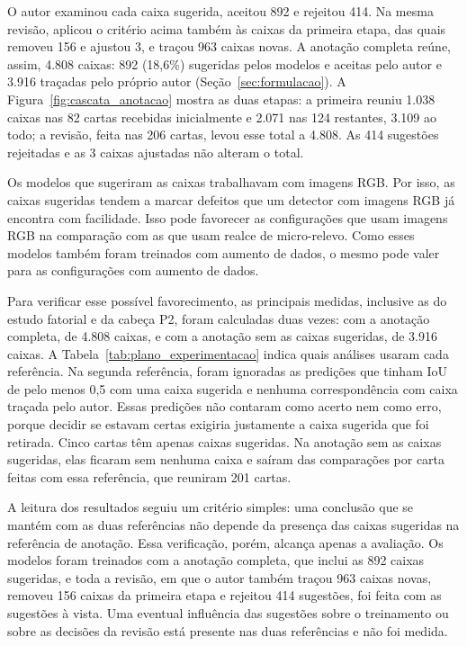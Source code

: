 \documentclass[
    12pt,                %
    openright,           %
    oneside,             %
    a4paper,             %
    english,             %
    brazil               %
]{abntex2}
\begin{document}
O autor examinou cada
caixa sugerida, aceitou 892 e rejeitou 414. Na mesma revisão, aplicou o
critério acima também às caixas da primeira etapa, das quais removeu
156 e ajustou 3, e traçou 963 caixas novas. A anotação completa reúne,
assim, 4.808 caixas: 892 (18,6\%) sugeridas pelos modelos e aceitas
pelo autor e 3.916 traçadas pelo próprio autor
(Seção~\ref{sec:formulacao}).
A Figura~\ref{fig:cascata_anotacao} mostra as duas etapas: a primeira
reuniu 1.038 caixas nas 82 cartas recebidas inicialmente e 2.071 nas
124 restantes, 3.109 ao todo; a revisão, feita nas 206 cartas, levou
esse total a 4.808. As 414 sugestões rejeitadas e as 3 caixas ajustadas
não alteram o total.

Os modelos que sugeriram as caixas trabalhavam com imagens RGB. Por
isso, as caixas sugeridas tendem a marcar defeitos que um detector com
imagens RGB já encontra com facilidade. Isso pode favorecer as
configurações que usam imagens RGB na comparação com as que usam
realce de micro-relevo. Como esses modelos também foram treinados com
aumento de dados, o mesmo pode valer para as configurações com aumento
de dados.

Para verificar esse possível favorecimento, as principais medidas,
inclusive as do estudo fatorial e da cabeça P2, foram calculadas duas
vezes: com a
anotação completa, de 4.808 caixas, e com a anotação sem as caixas
sugeridas, de 3.916 caixas. A Tabela~\ref{tab:plano_experimentacao}
indica quais análises usaram cada referência. Na segunda referência, foram ignoradas as
predições que tinham IoU de pelo menos 0,5 com uma caixa sugerida e
nenhuma correspondência com caixa traçada pelo autor. Essas predições
não contaram como acerto nem como erro, porque decidir se estavam
certas exigiria justamente a caixa sugerida que foi retirada. Cinco
cartas têm apenas caixas sugeridas. Na anotação sem as caixas
sugeridas, elas ficaram sem nenhuma caixa e saíram das comparações por
carta feitas com essa referência, que reuniram 201 cartas.

A leitura dos resultados seguiu um critério simples: uma conclusão que
se mantém com as duas referências não depende da presença das caixas
sugeridas na referência de anotação. Essa verificação, porém, alcança
apenas a avaliação. Os modelos foram treinados com a anotação
completa, que inclui as 892 caixas sugeridas, e toda a revisão, em que
o autor também traçou 963 caixas novas, removeu 156 caixas da primeira
etapa e rejeitou 414 sugestões, foi feita com as sugestões à vista.
Uma eventual influência das sugestões sobre o treinamento ou sobre as
decisões da revisão está presente nas duas referências e não foi
medida.
\end{document}
